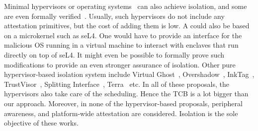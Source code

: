 Minimal hypervisors or operating systems~\cite{herder2006minix,klein2009sel4} can also achieve isolation, and some are even formally verified~\cite{klein2009sel4}. Usually, such hypervisors do not include any attestation primitives, but the cost of adding them is low. A \name{} could also be based on a microkernel such as seL4. One would have to provide an interface for the malicious OS running in a virtual machine to interact with enclaves that run directly on top of seL4. It might even be possible to formally prove such modifications to provide an even stronger assurance of isolation. Other pure hypervisor-based isolation system include Virtual Ghost~\cite{virtualGhost}, Overshadow~\cite{Overshadow}, InkTag~\cite{InkTag}, TrustVisor~\cite{TrustVisor}, Splitting Interface~\cite{SplittingInterfaces}, Terra~\cite{terra} etc. In all of these proposals, the hypervisors also take care of the scheduling. Hence the TCB is a lot bigger than our approach. Moreover, in none of the hypervisor-based proposals, peripheral awareness, and platform-wide attestation are considered. Isolation is the sole objective of these works.
\fi